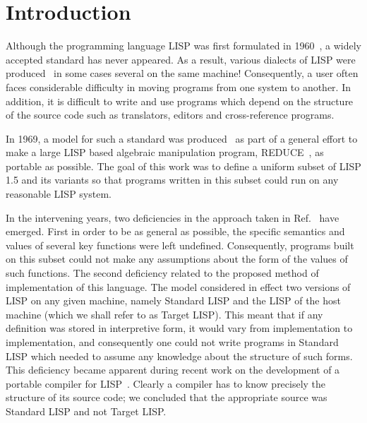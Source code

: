 \newcommand{\p}[1] {{\bf #1}}
\newcommand{\ty}[1] {{\em #1}}
%

\section{Introduction}
Although the programming language LISP was first formulated in
1960~\cite{LISP1.5}, a widely accepted standard has never appeared. As
a result, various dialects of LISP were
produced~\cite{CDC-LISP,LISP/360,MACLISP,Interlisp,LISPF1,LISP1.6} in
some cases several on the same machine! Consequently, a user often
faces considerable difficulty in moving programs from one system to
another. In addition, it is difficult to write and use programs which
depend on the structure of the source code such as translators,
editors and cross-reference programs.

In 1969, a model for such a standard was produced~\cite{Hearn:69} as
part of a general effort to make a large LISP based algebraic
manipulation program, REDUCE~\cite{REDUCE3.3}, as portable as
possible.  The goal of this work was to define a uniform subset of
LISP 1.5 and its variants so that programs written in this subset
could run on any reasonable LISP system.

In the intervening years, two deficiencies in the approach taken in
Ref.~\cite{Hearn:69} have emerged. First in order to be as general as
possible, the specific semantics and values of several key functions
were left undefined. Consequently, programs built on this subset could
not make any assumptions about the form of the values of such
functions. The second deficiency related to the proposed method of
implementation of this language. The model considered in effect two
versions of LISP on any given machine, namely Standard LISP and the
LISP of the host machine (which we shall refer to as Target LISP).
This meant that if any definition was stored in interpretive form, it
would vary from implementation to implementation, and consequently one
could not write programs in Standard LISP which needed to assume any
knowledge about the structure of such forms. This deficiency became
apparent during recent work on the development of a portable compiler
for LISP~\cite{PLC}. Clearly a compiler has to know precisely the
structure of its source code; we concluded that the appropriate source
was Standard LISP and not Target LISP.

